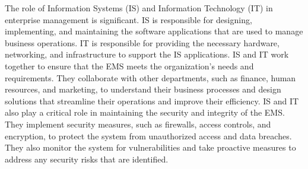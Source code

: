 \documentclass[12pt]{article}
\begin{document}
\begin{enumerate}
The role of Information Systems (IS) and Information Technology (IT) in enterprise management is significant. IS is responsible for designing, implementing, and maintaining the software applications that are used to manage business operations. IT is responsible for providing the necessary hardware, networking, and infrastructure to support the IS applications. IS and IT work together to ensure that the EMS meets the organization's needs and requirements. They collaborate with other departments, such as finance, human resources, and marketing, to understand their business processes and design solutions that streamline their operations and improve their efficiency. IS and IT also play a critical role in maintaining the security and integrity of the EMS. They implement security measures, such as firewalls, access controls, and encryption, to protect the system from unauthorized access and data breaches. They also monitor the system for vulnerabilities and take proactive measures to address any security risks that are identified.


\end{enumerate}
\end{document}

